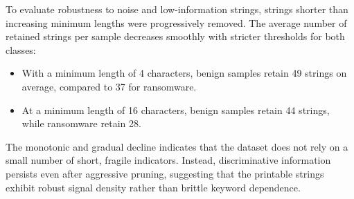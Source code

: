 \documentclass[conference]{IEEEtran}
\begin{document}
To evaluate robustness to noise and low-information strings, strings shorter than increasing minimum lengths were progressively removed. The average number of retained strings per sample decreases smoothly with stricter thresholds for both classes:
\begin{itemize}
    \item With a minimum length of 4 characters, benign samples retain 49 strings on average, compared to 37 for ransomware.
    \item At a minimum length of 16 characters, benign samples retain 44 strings, while ransomware retain 28.
\end{itemize}
The monotonic and gradual decline indicates that the dataset does not rely on a small number of short, fragile indicators. Instead, discriminative information persists even after aggressive pruning, suggesting that the printable strings exhibit robust signal density rather than brittle keyword dependence.\\
\end{document}
